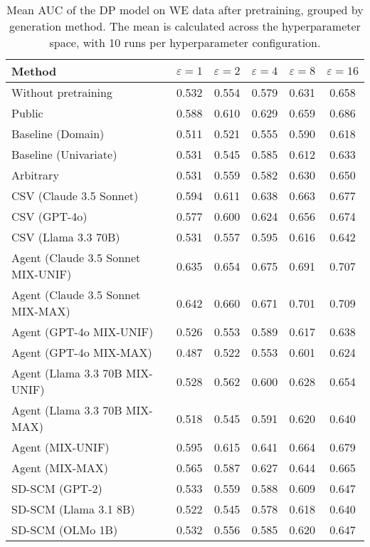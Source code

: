 \begin{table}[h!]
    \centering
    \caption{Mean AUC of the DP model on WE data after pretraining, grouped by generation method. The mean is calculated across the hyperparameter space, with 10 runs per hyperparameter configuration.}
    \label{tab:epsilon_comparison}
    \begin{tabular}{lccccc}
    \toprule
    Method & $\varepsilon=1$ & $\varepsilon=2$ & $\varepsilon=4$ & $\varepsilon=8$ & $\varepsilon=16$ \\
    \midrule
    Without pretraining & 0.532 & 0.554 & 0.579 & 0.631 & 0.658 \\
    \arrayrulecolor{black!50!}\midrule
    Public & 0.588 & 0.610 & 0.629 & 0.659 & \cellcolor{bronze!30}0.686 \\
    \arrayrulecolor{black!50!}\midrule
    Baseline (Domain) & 0.511 & 0.521 & 0.555 & 0.590 & 0.618 \\
    Baseline (Univariate) & 0.531 & 0.545 & 0.585 & 0.612 & 0.633 \\
    \arrayrulecolor{black!50!}\midrule
    Arbitrary & 0.531 & 0.559 & 0.582 & 0.630 & 0.650 \\
    \arrayrulecolor{black!50!}\midrule
    CSV (Claude 3.5 Sonnet) & 0.594 & 0.611 & 0.638 & 0.663 & 0.677 \\
    CSV (GPT-4o) & 0.577 & 0.600 & 0.624 & 0.656 & 0.674 \\
    CSV (Llama 3.3 70B) & 0.531 & 0.557 & 0.595 & 0.616 & 0.642 \\
    \arrayrulecolor{black!50!}\midrule
    Agent (Claude 3.5 Sonnet MIX-UNIF) & \cellcolor{silver!30}0.635 & \cellcolor{silver!30}0.654 & \cellcolor{gold!30}0.675 & \cellcolor{silver!30}0.691 & \cellcolor{silver!30}0.707 \\
    Agent (Claude 3.5 Sonnet MIX-MAX) & \cellcolor{gold!30}0.642 & \cellcolor{gold!30}0.660 & \cellcolor{silver!30}0.671 & \cellcolor{gold!30}0.701 & \cellcolor{gold!30}0.709 \\
    Agent (GPT-4o MIX-UNIF) & 0.526 & 0.553 & 0.589 & 0.617 & 0.638 \\
    Agent (GPT-4o MIX-MAX) & 0.487 & 0.522 & 0.553 & 0.601 & 0.624 \\
    Agent (Llama 3.3 70B MIX-UNIF) & 0.528 & 0.562 & 0.600 & 0.628 & 0.654 \\
    Agent (Llama 3.3 70B MIX-MAX) & 0.518 & 0.545 & 0.591 & 0.620 & 0.640 \\
    Agent (MIX-UNIF) & \cellcolor{bronze!30}0.595 & \cellcolor{bronze!30}0.615 & \cellcolor{bronze!30}0.641 & \cellcolor{bronze!30}0.664 & 0.679 \\
    Agent (MIX-MAX) & 0.565 & 0.587 & 0.627 & 0.644 & 0.665 \\
    \arrayrulecolor{black!50!}\midrule
    SD-SCM (GPT-2) & 0.533 & 0.559 & 0.588 & 0.609 & 0.647 \\
    SD-SCM (Llama 3.1 8B) & 0.522 & 0.545 & 0.578 & 0.618 & 0.640 \\
    SD-SCM (OLMo 1B) & 0.532 & 0.556 & 0.585 & 0.620 & 0.647 \\
    \bottomrule
    \end{tabular}
\end{table}